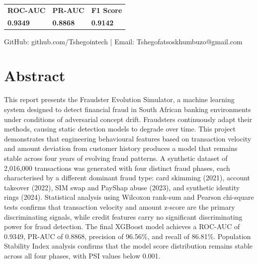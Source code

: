 \documentclass[12pt, a4paper]{article}
\begin{document}
\begin{titlepage}
\vspace{1.5cm}

\begin{tabular}{C{3.5cm}C{3.5cm}C{3.5cm}}
\textcolor{spugold}{\textbf{ROC-AUC}} & \textcolor{spugold}{\textbf{PR-AUC}} & \textcolor{spugold}{\textbf{F1 Score}} \\[0.3cm]
{\Large\textbf{0.9349}} & {\Large\textbf{0.8868}} & {\Large\textbf{0.9142}} \\
\end{tabular}

\vfill
{\fontsize{9}{12}\selectfont\textcolor{midgray}{
GitHub: github.com/Tshegointech \quad | \quad
Email: Tshegofatsoskhumbuzo@gmail.com
}}
\end{titlepage}

\nopagecolor
\color{black}

\newpage
\tableofcontents
\newpage

\section{Abstract}

This report presents the Fraudster Evolution Simulator, a machine learning system designed to detect financial fraud in South African banking environments under conditions of adversarial concept drift. Fraudsters continuously adapt their methods, causing static detection models to degrade over time. This project demonstrates that engineering behavioural features based on transaction velocity and amount deviation from customer history produces a model that remains stable across four years of evolving fraud patterns. A synthetic dataset of 2,016,000 transactions was generated with four distinct fraud phases, each characterised by a different dominant fraud type: card skimming (2021), account takeover (2022), SIM swap and PayShap abuse (2023), and synthetic identity rings (2024). Statistical analysis using Wilcoxon rank-sum and Pearson chi-square tests confirms that transaction velocity and amount z-score are the primary discriminating signals, while credit features carry no significant discriminating power for fraud detection. The final XGBoost model achieves a ROC-AUC of 0.9349, PR-AUC of 0.8868, precision of 96.56\%, and recall of 86.81\%. Population Stability Index analysis confirms that the model score distribution remains stable across all four phases, with PSI values below 0.001.
\end{document}
